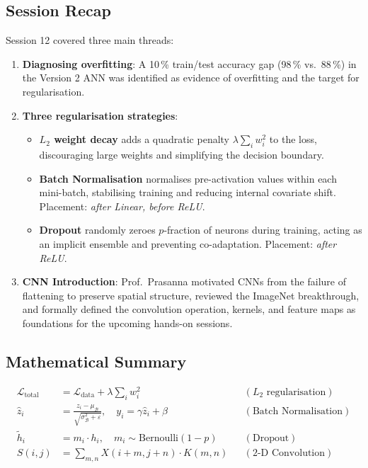 \documentclass[12pt,a4paper]{article}
\newcommand{\Ltwo}{L_2}
\begin{document}
\subsection{Session Recap}
\label{sec:summary:recap}

Session 12 covered three main threads:

\begin{enumerate}
  \item \textbf{Diagnosing overfitting}: A 10\,\% train/test accuracy gap
        (98\,\% vs.\ 88\,\%) in the Version 2 ANN was identified as
        evidence of overfitting and the target for regularisation.

  \item \textbf{Three regularisation strategies}:
    \begin{itemize}
      \item \textbf{$\Ltwo$ weight decay} adds a quadratic penalty
            $\lambda\sum_i w_i^2$ to the loss, discouraging large weights and
            simplifying the decision boundary.
      \item \textbf{Batch Normalisation} normalises pre-activation values
            within each mini-batch, stabilising training and reducing internal
            covariate shift.  Placement: \emph{after Linear, before ReLU}.
      \item \textbf{Dropout} randomly zeroes $p$-fraction of neurons during
            training, acting as an implicit ensemble and preventing
            co-adaptation.  Placement: \emph{after ReLU}.
    \end{itemize}

  \item \textbf{CNN Introduction}: Prof.\ Prasanna motivated CNNs from the
        failure of flattening to preserve spatial structure, reviewed the
        ImageNet breakthrough, and formally defined the convolution operation,
        kernels, and feature maps as foundations for the upcoming hands-on
        sessions.
\end{enumerate}

\subsection{Mathematical Summary}
\label{sec:summary:math}

\begin{align}
  \mathcal{L}_{\text{total}}
    &= \mathcal{L}_{\text{data}} + \lambda \sum_i w_i^2
    & &(\Ltwo\text{ regularisation}) \label{eq:summary_l2} \\[4pt]
  \hat{z}_i
    &= \frac{z_i - \mu_\mathcal{B}}{\sqrt{\sigma^2_\mathcal{B}+\varepsilon}},
      \quad y_i = \gamma\hat{z}_i + \beta
    & &(\text{Batch Normalisation}) \label{eq:summary_bn} \\[4pt]
  \tilde{h}_i
    &= m_i \cdot h_i, \quad m_i \sim \mathrm{Bernoulli}(1-p)
    & &(\text{Dropout}) \label{eq:summary_dropout} \\[4pt]
  S(i,j)
    &= \sum_{m,n} X(i+m,j+n)\cdot K(m,n)
    & &(\text{2-D Convolution}) \label{eq:summary_conv}
\end{align}
\end{document}
